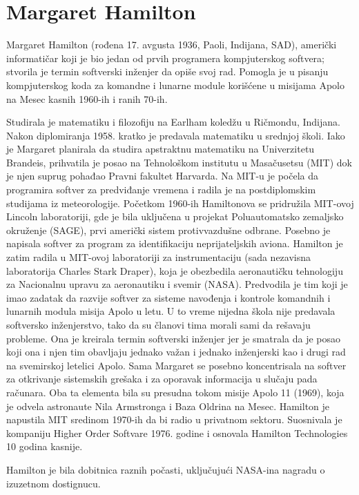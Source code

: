 \documentclass[a4paper,12pt]{article}
\begin{document}
\newpage
\section{Margaret Hamilton}

\begin{flushleft}
 Margaret Hamilton (rođena 17. avgusta 1936, Paoli, Indijana, SAD), američki informatičar koji je bio jedan od prvih programera kompjuterskog softvera; stvorila je termin softverski inženjer da opiše svoj rad. Pomogla je u pisanju kompjuterskog koda za komandne i lunarne module korišćene u misijama Apolo na Mesec kasnih 1960-ih i ranih 70-ih.

    Studirala je matematiku i filozofiju na Earlham koledžu u Ričmondu, Indijana. Nakon diplomiranja 1958. kratko je predavala matematiku u srednjoj školi. Iako je Margaret planirala da studira apstraktnu matematiku na Univerzitetu Brandeis, prihvatila je posao na Tehnološkom institutu u Masačusetsu (MIT) dok je njen suprug pohađao Pravni fakultet Harvarda. Na MIT-u je počela da programira softver za predviđanje vremena i radila je na postdiplomskim studijama iz meteorologije.
    Početkom 1960-ih Hamiltonova se pridružila MIT-ovoj Lincoln laboratoriji, gde je bila uključena u projekat Poluautomatsko zemaljsko okruženje (SAGE), prvi američki sistem protivvazdušne odbrane. Posebno je napisala softver za program za identifikaciju neprijateljskih aviona. Hamilton je zatim radila u MIT-ovoj laboratoriji za instrumentaciju (sada nezavisna laboratorija Charles Stark Draper), koja je obezbedila aeronautičku tehnologiju za Nacionalnu upravu za aeronautiku i svemir (NASA). Predvodila je tim koji je imao zadatak da razvije softver za sisteme navođenja i kontrole komandnih i lunarnih modula misija Apolo u letu. U to vreme nijedna škola nije predavala softversko inženjerstvo, tako da su članovi tima morali sami da rešavaju probleme. Ona je kreirala termin softverski inženjer jer je smatrala da je posao koji ona i njen tim obavljaju jednako važan i jednako inženjerski kao i drugi rad na svemirskoj letelici Apolo. Sama Margaret se posebno koncentrisala na softver za otkrivanje sistemskih grešaka i za oporavak informacija u slučaju pada računara. Oba ta elementa bila su presudna tokom misije Apolo 11 (1969), koja je odvela astronaute Nila Armstronga i Baza Oldrina na Mesec. Hamilton je napustila MIT sredinom 1970-ih da bi radio u privatnom sektoru. Suosnivala je kompaniju Higher Order Softvare 1976. godine i osnovala Hamilton Technologies 10 godina kasnije.

    Hamilton je bila dobitnica raznih počasti, uključujući NASA-ina nagradu o izuzetnom dostignucu.
    \end{flushleft}
    
\end{document}
